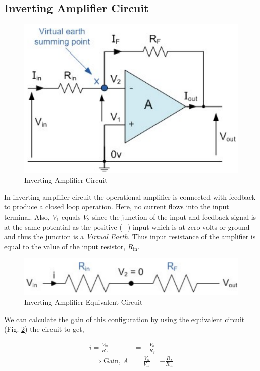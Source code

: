 \subsection{Inverting Amplifier Circuit}

\begin{figure}[H]
    \centering
    \includegraphics[width=0.7\columnwidth]{images/inv1.png}
    \caption{Inverting Amplifier Circuit}
    \label{inv1}
\end{figure}

In inverting amplifier circuit the operational amplifier is connected with feedback to produce a closed loop operation. Here, no current flows into the input terminal. Also, $V_1$ equals $V_2$ since the junction of the input and feedback signal is at the same potential as the positive (+) input which is at zero volts or ground and thus the junction is a \textit{Virtual Earth}. Thus input resistance of the amplifier is equal to the value of the input resistor, $R_\text{in}$.

\begin{figure}[H]
    \centering
    \includegraphics[width=0.8\columnwidth]{images/inv2.png}
    \caption{Inverting Amplifier Equivalent Circuit}
    \label{inv2}
\end{figure}

We can calculate the gain of this configuration by using the equivalent circuit (Fig. \ref{inv2}) the circuit to get,

\begin{align}
    i = \frac{V_\text{in}}{R_\text{in}} &= -\frac{V_\text{o}}{R_f} \nonumber \\
    \implies \text{Gain, } A &= \frac{V_\text{o}}{V_\text{in}} = -\frac{R_f}{R_\text{in}} \label{inv gain}
\end{align}

